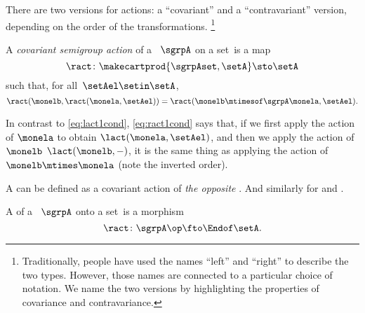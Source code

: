 There are two versions for actions: a ``covariant'' and a ``contravariant'' version, depending on the order of the transformations.
\footnote{
    Traditionally, people have used the names ``left'' and ``right'' to describe the two types.
    However, those names are connected to a particular choice of notation.
    We name the two versions by highlighting the properties of covariance and contravariance.
}

\begin{ctdefinition}
    \label{def:semigroup-contra-action-prelim}
    A \emph{covariant semigroup action} of a ~$\sgrpA$ on a set~\setA is a map
    \begin{equation}
        \label{eq:ract}
        \ract \colon \makecartprod{\sgrpAset, \setA} \sto \setA
    \end{equation}
    such that, for all~$\setAel \setin \setA$,
    \begin{equation}
        \label{eq:ract1cond}
        \ract(\monelb, \ract(\monela, \setAel)) = \ract(\monelb \mtimesof\sgrpA  \monela, \setAel).
    \end{equation}
\end{ctdefinition}

In contrast to \cref{eq:lact1cond},  \cref{eq:ract1cond} says that, if we first apply the action of $\monela$ to obtain $\lact(\monela, \setAel)$,
and then we apply the action of $\monelb$ $\lact(\monelb, -)$, it is the same thing as applying the action of $\monelb\mtimes\monela$ (note the inverted order).

A  can be defined as a covariant action of \emph{the opposite} .
And similarly for  and .

\begin{ctdefinition}
    \label{def:semigroup-cont-action}
    A  of a ~$\sgrpA$ onto a set~\setA is a  morphism
    \begin{equation}
        \ract \colon \sgrpA\op \fto \Endof\setA.
    \end{equation}
\end{ctdefinition}

